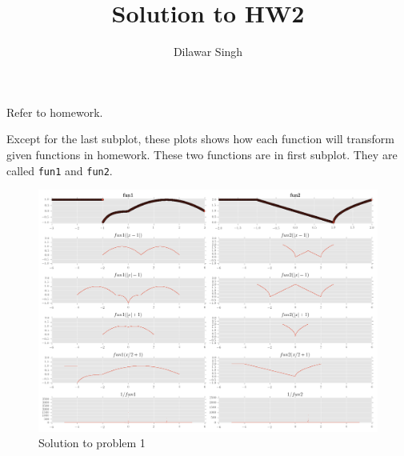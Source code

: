 \documentclass[answers,addpoints]{exam}
\title{Solution to HW2}
\author{Dilawar Singh}
\begin{document}
\Large
\maketitle

\begin{questions}


    Refer to homework.

    \begin{solution}

        Except for the last subplot, these plots shows how each function
        will transform given functions in homework. These two functions are in
        first subplot. They are called \texttt{fun1} and \texttt{fun2}.

        \begin{figure}[H]
        \begin{center}
            \includegraphics[width=1\textwidth]{./solution1.png}
        \end{center}
        \caption{Solution to problem 1}
        \label{fig:}
        \end{figure}

    \end{solution}

\end{questions}
\end{document}
